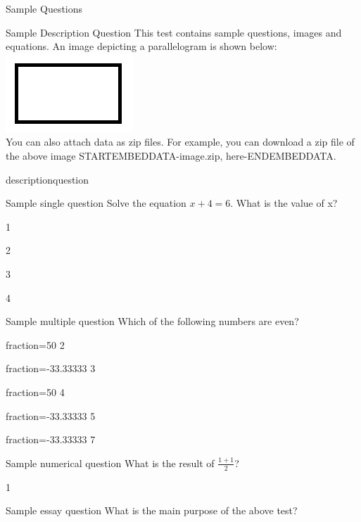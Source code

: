 \documentclass[12pt]{article}
\begin{document}
\begin{quiz}{Sample Questions}

\begin{shortanswer}[default grade=0.0000000, penalty=0.0000000]{Sample Description Question}
This test contains sample questions, images and equations. An image depicting a parallelogram is shown below:\\
\includegraphics{image.png}\\
You can also attach data as zip files. For example, you can download a zip file of the above image STARTEMBEDDATA-image.zip, here-ENDEMBEDDATA.
\color{white}
\item descriptionquestion
\end{shortanswer}

\begin{multi}{Sample single question}
Solve the equation ${x + 4 = 6}$. What is the value of x?
\item 1
\item* 2
\item 3
\item 4
\end{multi}

\begin{multi}[multiple]{Sample multiple question}
Which of the following numbers are even?
\item[fraction=50] 2
\item[fraction=-33.33333] 3
\item[fraction=50] 4
\item[fraction=-33.33333] 5
\item[fraction=-33.33333] 7
\end{multi}

\begin{numerical}{Sample numerical question}
What is the result of ${\frac{1 + 1}{2}}$?
\item 1
\end{numerical}

\begin{essay}{Sample essay question}
What is the main purpose of the above test?
\end{essay}

\end{quiz}
\end{document}
